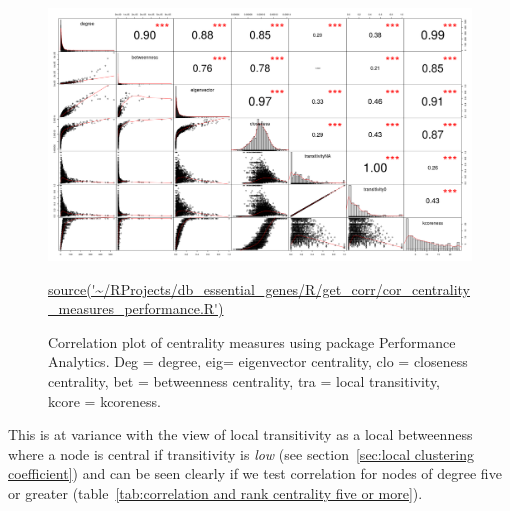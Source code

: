 \begin{figure}
    \centering
    \includegraphics[width=\textwidth]{images/chapter3/cor_pairs/analytics/Rplot_analytics_spearman_cor.png}
    \caption{Correlation plot of centrality measures using package Performance Analytics. Deg = degree, eig= eigenvector centrality, clo = closeness centrality, bet = betweenness centrality, tra = local transitivity, kcore = kcoreness.}
    \tiny\url{source('~/RProjects/db_essential_genes/R/get_corr/cor_centrality_measures_performance.R')}
    \label{fig:Correlation plot centrality performance analytics}
\end{figure}







  This is at variance with the view of local transitivity as a local betweenness where a node is central if transitivity is \textit{low} (see section~\ref{sec:local clustering coefficient}) and can be seen clearly if we test correlation for nodes of degree five or greater (table~\ref{tab:correlation and rank centrality five or more}).



